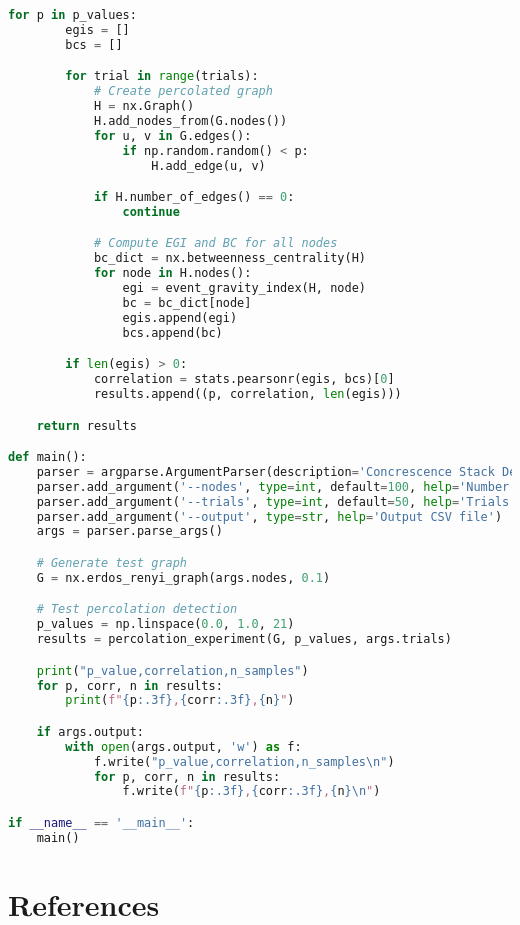 \documentclass[11pt]{article}
\begin{document}
\begin{lstlisting}[language=Python]
    for p in p_values:
        egis = []
        bcs = []

        for trial in range(trials):
            # Create percolated graph
            H = nx.Graph()
            H.add_nodes_from(G.nodes())
            for u, v in G.edges():
                if np.random.random() < p:
                    H.add_edge(u, v)

            if H.number_of_edges() == 0:
                continue

            # Compute EGI and BC for all nodes
            bc_dict = nx.betweenness_centrality(H)
            for node in H.nodes():
                egi = event_gravity_index(H, node)
                bc = bc_dict[node]
                egis.append(egi)
                bcs.append(bc)

        if len(egis) > 0:
            correlation = stats.pearsonr(egis, bcs)[0]
            results.append((p, correlation, len(egis)))

    return results

def main():
    parser = argparse.ArgumentParser(description='Concrescence Stack Demo')
    parser.add_argument('--nodes', type=int, default=100, help='Number of nodes')
    parser.add_argument('--trials', type=int, default=50, help='Trials per p-value')
    parser.add_argument('--output', type=str, help='Output CSV file')
    args = parser.parse_args()

    # Generate test graph
    G = nx.erdos_renyi_graph(args.nodes, 0.1)

    # Test percolation detection
    p_values = np.linspace(0.0, 1.0, 21)
    results = percolation_experiment(G, p_values, args.trials)

    print("p_value,correlation,n_samples")
    for p, corr, n in results:
        print(f"{p:.3f},{corr:.3f},{n}")

    if args.output:
        with open(args.output, 'w') as f:
            f.write("p_value,correlation,n_samples\n")
            for p, corr, n in results:
                f.write(f"{p:.3f},{corr:.3f},{n}\n")

if __name__ == '__main__':
    main()
\end{lstlisting}

\section*{References}
\end{document}
